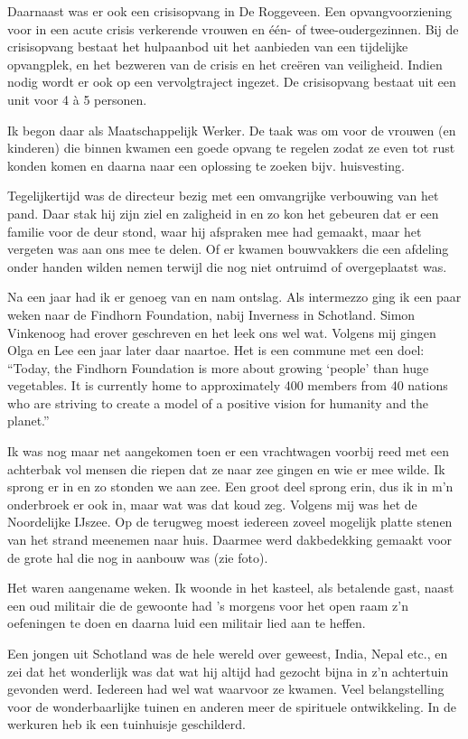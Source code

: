 \documentclass[10pt,twoside,openright]{memoir}
\begin{document}
Daarnaast was er ook een crisisopvang in De Roggeveen. Een opvangvoorziening voor in een acute crisis verkerende vrouwen en één- of twee-oudergezinnen. Bij de crisisopvang bestaat het hulpaanbod uit het aanbieden van een tijdelijke opvangplek, en het bezweren van de crisis en het creëren van veiligheid. Indien nodig wordt er ook op een vervolgtraject ingezet. De crisisopvang bestaat uit een unit voor 4 à 5 personen.

Ik begon daar als Maatschappelijk Werker. De taak was om voor de vrouwen (en kinderen) die binnen kwamen een goede opvang te regelen zodat ze even tot rust konden komen en daarna naar een oplossing te zoeken bijv. huisvesting. 

Tegelijkertijd was de directeur bezig met een omvangrijke verbouwing van het pand. Daar stak hij zijn ziel en zaligheid in en zo kon het gebeuren dat er een familie voor de deur stond, waar hij afspraken mee had gemaakt, maar het vergeten was aan ons mee te delen. Of er kwamen bouwvakkers die een afdeling onder handen wilden nemen terwijl die nog niet ontruimd of overgeplaatst was. 

Na een jaar had ik er genoeg van en nam ontslag. Als intermezzo ging ik een paar weken naar de Findhorn Foundation, nabij Inverness in Schotland. Simon Vinkenoog had erover geschreven en het leek ons wel wat. Volgens mij gingen Olga en Lee een jaar later daar naartoe. Het is een commune met een doel: ``Today, the Findhorn Foundation is more about growing `people' than huge vegetables. It is currently home to approximately 400 members from 40 nations who are striving to create a model of a positive vision for humanity and the planet.''

Ik was nog maar net aangekomen toen er een vrachtwagen voorbij reed met een achterbak vol mensen die riepen dat ze naar zee gingen en wie er mee wilde. Ik sprong er in en zo stonden we aan zee. Een groot deel sprong erin, dus ik in m’n onderbroek er ook in, maar wat was dat koud zeg. Volgens mij was het de Noordelijke IJszee. Op de terugweg moest iedereen zoveel mogelijk platte stenen van het strand meenemen naar huis. Daarmee werd dakbedekking gemaakt voor de grote hal die nog in aanbouw was (zie foto). 

Het waren aangename weken. Ik woonde in het kasteel, als betalende gast, naast een oud militair die de gewoonte had ’s morgens voor het open raam z’n oefeningen te doen en daarna luid een militair lied aan te heffen. 

Een jongen uit Schotland was de hele wereld over geweest, India, Nepal etc., en zei dat het wonderlijk was dat wat hij altijd had gezocht bijna in z’n achtertuin gevonden werd. Iedereen had wel wat waarvoor ze kwamen. Veel belangstelling voor de wonderbaarlijke tuinen en anderen meer de spirituele ontwikkeling. In de werkuren heb ik een tuinhuisje geschilderd. 
\end{document}
